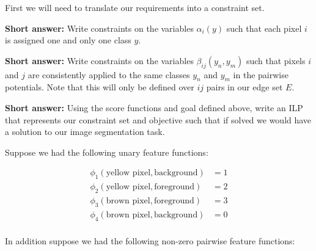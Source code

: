 \documentclass[11pt,addpoints,answers]{exam}
\numberwithin{equation}{section} %
\numberwithin{figure}{section} %
\numberwithin{table}{section} %
\begin{document}
First we will need to translate our requirements into a constraint set. 
\begin{questions}
\question[2] \textbf{Short answer:} Write constraints on the variables $\alpha_i(y)$ such that each pixel $i$ is assigned one and only one class $y$.

\begin{tcolorbox}[fit,height=2cm, width=15cm, blank, borderline={1pt}{-2pt}]
    \end{tcolorbox}
    

\question[4] \textbf{Short answer:} Write constraints on the variables $\beta_{ij}(y_n, y_m)$ such that pixels $i$ and $j$ are consistently applied to the same classes $y_n$ and $y_m$ in the pairwise potentials. Note that this will only be defined over $ij$ pairs in our edge set $E$. 

\begin{tcolorbox}[fit,height=6cm, width=15cm, blank, borderline={1pt}{-2pt}]
    \end{tcolorbox}



\question[2] \textbf{Short answer:} Using the score functions and goal defined above, write an ILP that represents our constraint set and objective such that if solved we would have a solution to our image segmentation task.

\begin{tcolorbox}[fit,height=8cm, width=15cm, blank, borderline={1pt}{-2pt}]
    \end{tcolorbox}

\clearpage
Suppose we had the following unary feature functions:

\begin{equation*}
    \begin{split}
        \phi_1(\text{yellow pixel}, \text{background}) &= 1 \\
        \phi_2(\text{yellow pixel}, \text{foreground}) &= 2 \\
        \phi_3(\text{brown pixel}, \text{foreground}) &= 3 \\
        \phi_4(\text{brown pixel}, \text{background}) &= 0 \\
    \end{split}
\end{equation*}

In addition suppose we had the following non-zero pairwise feature functions:


\end{questions}
\end{document}
